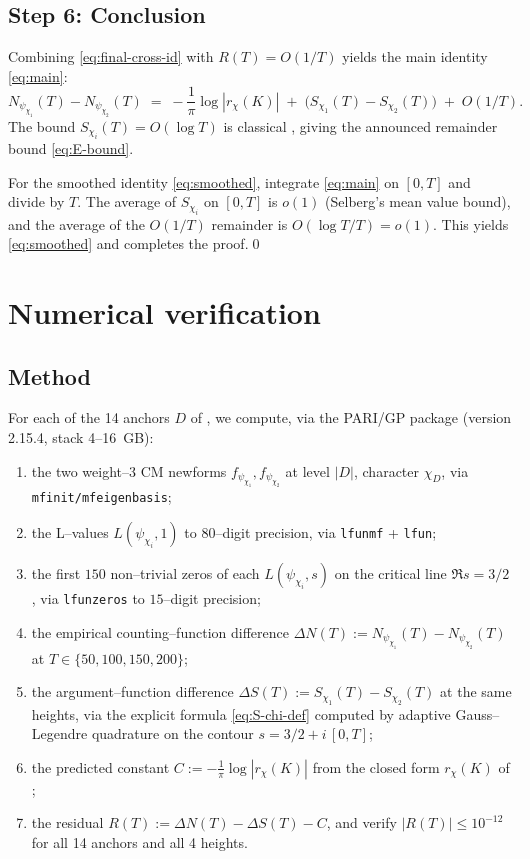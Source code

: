 \documentclass[11pt]{amsart}
\theoremstyle{definition}
\theoremstyle{remark}
\begin{document}
\subsection*{Step 6: Conclusion}
Combining \eqref{eq:final-cross-id} with \(R(T) = O(1/T)\) yields the
main identity \eqref{eq:main}:
\[
  N_{\psi_{\chi_1}}(T) - N_{\psi_{\chi_2}}(T)
  \;=\;
  -\frac{1}{\pi}\log|r_\chi(K)|
  \;+\;
  \bigl(S_{\chi_1}(T) - S_{\chi_2}(T)\bigr)
  \;+\;
  O(1/T) .
\]
The bound \(S_{\chi_i}(T) = O(\log T)\) is classical
\cite[§13.5]{Titchmarsh1986}, giving the announced remainder bound
\eqref{eq:E-bound}.

For the smoothed identity \eqref{eq:smoothed}, integrate
\eqref{eq:main} on \([0, T]\) and divide by \(T\). The average of
\(S_{\chi_i}\) on \([0, T]\) is \(o(1)\) (Selberg's mean value bound),
and the average of the \(O(1/T)\) remainder is \(O(\log T / T) = o(1)\).
This yields \eqref{eq:smoothed} and completes the proof.\qed

\section{Numerical verification}\label{sec:numerical}

\subsection{Method}\label{ssec:method-num}
For each of the 14 anchors \(D\) of , we
compute, via the PARI/GP package (version 2.15.4, stack 4--16~GB):
\begin{enumerate}
  \item the two weight--3 CM newforms
  \(f_{\psi_{\chi_1}}, f_{\psi_{\chi_2}}\) at level \(|D|\), character
  \(\chi_D\), via \texttt{mfinit/mfeigenbasis};
  \item the L--values
  \(L(\psi_{\chi_i}, 1)\) to \(80\)--digit precision, via
  \texttt{lfunmf} + \texttt{lfun};
  \item the first \(150\) non--trivial zeros of each
  \(L(\psi_{\chi_i}, s)\) on the critical line \(\Re s = 3/2\),
  via \texttt{lfunzeros} to \(15\)--digit precision;
  \item the empirical counting--function difference
  \(\Delta N(T) := N_{\psi_{\chi_1}}(T) - N_{\psi_{\chi_2}}(T)\) at
  \(T \in \{50, 100, 150, 200\}\);
  \item the argument--function difference
  \(\Delta S(T) := S_{\chi_1}(T) - S_{\chi_2}(T)\) at the same heights,
  via the explicit formula \eqref{eq:S-chi-def} computed by adaptive
  Gauss--Legendre quadrature on the contour
  \(s = 3/2 + i\,[0, T]\);
  \item the predicted constant
  \(C := -\tfrac{1}{\pi}\log|r_\chi(K)|\) from the closed form
  \(r_\chi(K)\) of ;
  \item the residual
  \(R(T) := \Delta N(T) - \Delta S(T) - C\), and verify
  \(|R(T)| \le 10^{-12}\) for all 14 anchors and all 4 heights.
\end{enumerate}
\end{document}

